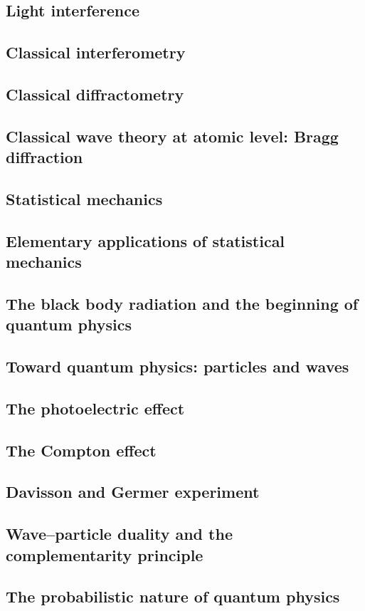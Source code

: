 \documentclass{article}
\begin{document}
\subsection{Light interference}
\subsection{Classical interferometry}
\subsection{Classical diffractometry}
\subsection{Classical wave theory at atomic level: Bragg diffraction}
\subsection{Statistical mechanics}
\subsection{Elementary applications of statistical mechanics}
\subsection{The black body radiation and the beginning of quantum physics}
\subsection{Toward quantum physics: particles and waves}
\subsection{The photoelectric effect}
\subsection{The Compton effect}
\subsection{Davisson and Germer experiment}
\subsection{Wave–particle duality and the complementarity principle}
\subsection{The probabilistic nature of quantum physics}
\end{document}
